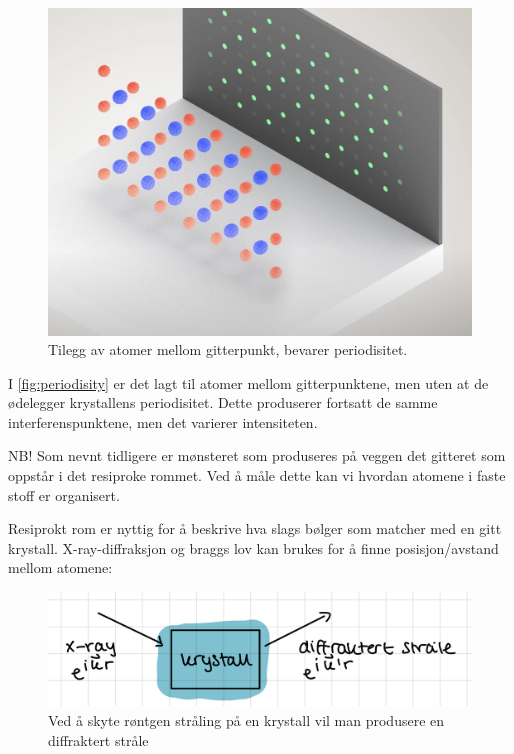 \begin{figure}[!htb]
    \centering
    \includegraphics[scale=0.42]{Bilder/SamtaleTema4/skrot.png}
    \caption{Tilegg av atomer mellom gitterpunkt, bevarer periodisitet.}
    \label{fig:periodisity}
\end{figure}

I \autoref{fig:periodisity} er det lagt til atomer mellom gitterpunktene, men uten at de ødelegger krystallens periodisitet. Dette produserer fortsatt de samme interferenspunktene, men det varierer intensiteten.

NB! Som nevnt tidligere er mønsteret som produseres på veggen det gitteret som oppstår i det resiproke rommet. Ved å måle dette kan vi hvordan atomene i faste stoff er organisert.

Resiprokt rom er nyttig for å beskrive hva slags bølger som matcher med en gitt krystall. X-ray-diffraksjon og braggs lov kan brukes for å finne posisjon/avstand mellom atomene:

\begin{figure}[!htb]
    \centering
    \includegraphics[scale=0.1]{Bilder/SamtaleTema4/diffraksjon.jpeg}
    \caption{Ved å skyte røntgen stråling på en krystall vil man produsere en diffraktert stråle}
    \label{fig:diffrak}
\end{figure}

